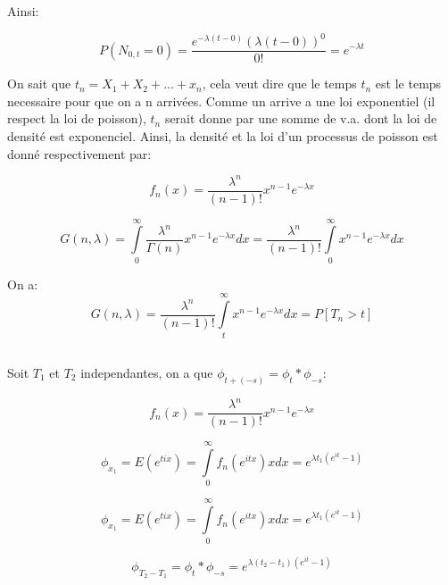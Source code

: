 \documentclass[a4paper]{article}
\begin{document}
Ainsi:

\begin{equation}
P(N_{0,t}=0)=\frac{e^{-\lambda (t-0)}(\lambda (t-0))^0}{0!}=e^{-\lambda t} 
\end{equation}


On sait que $t_n= X_1 + X_2+ ...+ x_n$, cela veut dire que le temps $t_n$ est le
temps necessaire pour que on a n arrivées. Comme un arrive a une loi exponentiel
(il respect la loi de poisson), $t_n$ serait donne par une somme de v.a. dont la
loi de  densité est exponenciel. Ainsi, la  densité et la loi  d'un processus de
poisson est donné respectivement par:

\begin{equation}
f_n(x)=\frac{\lambda^{n}}{(n-1)!}x^{n-1}e^{-\lambda x}
\end{equation}

\begin{equation}
G(n,\lambda)= \int\limits_0^\infty \frac{\lambda^{n}}{\Gamma (n)}x^{n-1}e^{-\lambda x}dx=\frac{\lambda^{n}}{(n-1)!}\int\limits_0^\infty x^{n-1}e^{-\lambda x}dx
\end{equation}

On a:
\begin{equation}
G(n,\lambda)=\frac{\lambda^{n}}{(n-1)!}\int\limits_t^\infty x^{n-1}e^{-\lambda x}dx=P[T_n > t]
\end{equation}


\subsection{}
Soit $T_1$ et $T_2$ independantes, on a que $\phi_{t+(-s)}=\phi_t*\phi_{-s}$:

\begin{equation}
f_n(x)=\frac{\lambda^{n}}{(n-1)!}x^{n-1}e^{-\lambda x}
\end{equation}

\begin{equation}
\phi_{x_1}=E(e^{tix})=\int\limits_0^\infty f_n(e^{itx})xdx=e^{\lambda t_1(e^{it}-1)}
\end{equation}

\begin{equation}
\phi_{x_1}=E(e^{tix})=\int\limits_0^\infty f_n(e^{itx})xdx=e^{\lambda t_1(e^{it}-1)}
\end{equation}

\begin{equation}
\phi_{T_2-T_1}=\phi_t*\phi_{-s}=e^{\lambda (t_2-t_1)(e^{it}-1)}
\end{equation}
\end{document}
